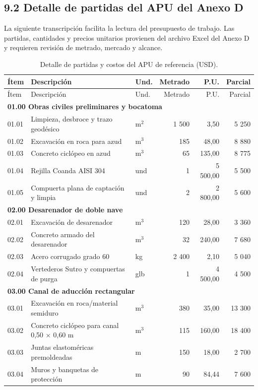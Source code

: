 \documentclass[11pt,a4paper]{article}
\begin{document}
\subsection*{9.2 Detalle de partidas del APU del Anexo D}
La siguiente transcripción facilita la lectura del presupuesto de trabajo. Las partidas, cantidades y precios unitarios provienen del archivo Excel del Anexo D y requieren revisión de metrado, mercado y alcance.
\begin{longtable}{p{.8cm}p{6.0cm}p{.8cm}r r r}
\caption{Detalle de partidas y costos del APU de referencia (USD).}\\
\toprule Ítem & Descripción & Und. & Metrado & P.U. & Parcial\\\midrule\endfirsthead
\toprule Ítem & Descripción & Und. & Metrado & P.U. & Parcial\\\midrule\endhead
\multicolumn{6}{l}{\textbf{01.00 Obras civiles preliminares y bocatoma}}\\
01.01 & Limpieza, desbroce y trazo geodésico & m$^2$ & 1 500 & 3,50 & 5 250\\
01.02 & Excavación en roca para azud & m$^3$ & 185 & 48,00 & 8 880\\
01.03 & Concreto ciclópeo en azud & m$^3$ & 65 & 135,00 & 8 775\\
01.04 & Rejilla Coanda AISI 304 & und & 1 & 5 500,00 & 5 500\\
01.05 & Compuerta plana de captación y limpia & und & 2 & 2 800,00 & 5 600\\
\multicolumn{6}{l}{\textbf{02.00 Desarenador de doble nave}}\\
02.01 & Excavación de desarenador & m$^3$ & 120 & 28,00 & 3 360\\
02.02 & Concreto armado del desarenador & m$^3$ & 32 & 240,00 & 7 680\\
02.03 & Acero corrugado grado 60 & kg & 2 400 & 2,10 & 5 040\\
02.04 & Vertederos Sutro y compuertas de purga & glb & 1 & 4 500,00 & 4 500\\
\multicolumn{6}{l}{\textbf{03.00 Canal de aducción rectangular}}\\
03.01 & Excavación en roca/material semiduro & m$^3$ & 380 & 35,00 & 13 300\\
03.02 & Concreto ciclópeo para canal 0,50 × 0,60 m & m$^3$ & 115 & 160,00 & 18 400\\
03.03 & Juntas elastoméricas premoldeadas & m & 150 & 18,00 & 2 700\\
03.04 & Muros y banquetas de protección & m & 90 & 84,44 & 7 600\\

\end{longtable}
\end{document}
